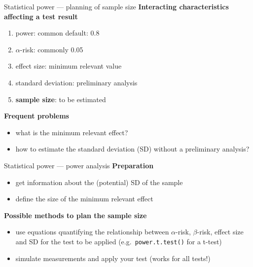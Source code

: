 \documentclass[
  ignorenonframetext,
  aspectratio=169,
  t]{beamer}
\providecommand{\tightlist}{%
  \setlength{\itemsep}{0pt}\setlength{\parskip}{0pt}}
\newcommand{\bluenorm}[1]{\textcolor{bluebeamer}{#1}}
\newcommand{\bluebold}[1]{\textcolor{bluebeamer}{\textbf{#1}}}
\let\oldtexttt\texttt
\renewcommand{\texttt}[1]{\colorbox{gray!20}{\oldtexttt{#1}}}
\begin{document}
\begin{frame}{Statistical power --- planning of sample size}
\protect{}\label{statistical-power-planning-of-sample-size-1}
\bluebold{Interacting characteristics affecting a test result}

\begin{enumerate}
\tightlist
\item
  power: common default: 0.8
\item
  \(\alpha\)-risk: commonly 0.05
\item
  \bluenorm{effect size}: minimum relevant value
\item
  \bluenorm{standard deviation}: preliminary analysis
\item
  \bluebold{sample size}: to be estimated
\end{enumerate}

\vspace{0.5cm}

\pause

\bluebold{Frequent problems}

\begin{itemize}
\tightlist
\item
  what is the minimum relevant effect?
\item
  how to estimate the standard deviation (SD) without a preliminary
  analysis?
\end{itemize}
\end{frame}

\begin{frame}[fragile]{Statistical power --- power analysis}
\protect{}\label{statistical-power-power-analysis}
\bluebold{Preparation}

\begin{itemize}
\tightlist
\item
  get information about the (potential) SD of the sample
\item
  define the size of the minimum relevant effect
\end{itemize}

\vspace{0.5cm}

\bluebold{Possible methods to plan the sample size}

\begin{itemize}
\tightlist
\item
  use equations quantifying the relationship between \(\alpha\)-risk,
  \(\beta\)-risk, effect size and SD for the test to be applied
  (e.g.~\texttt{power.t.test()} for a t-test)
\item
  simulate measurements and apply your test (works for all tests!)
\end{itemize}
\end{frame}
\end{document}
